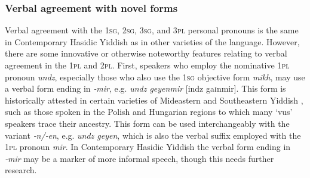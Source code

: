 \documentclass[output=paper, hidelinks]{langscibook}
\begin{document}

 


\subsubsection{Verbal agreement with novel forms}\label{sec:verbalfindings}

Verbal agreement with the 1\textsc{sg}, 2\textsc{sg}, 3\textsc{sg}, and 3\textsc{pl} personal pronouns is the same in Contemporary Hasidic Yiddish as in other varieties of the language. However, there are some innovative or otherwise noteworthy features relating to verbal agreement in the 1\textsc{pl} and 2\textsc{pl}. First, speakers who employ the nominative 1\textsc{pl} pronoun \textit{undz}, especially those who also use the 1\textsc{sg} objective form \textit{mikh}, may use a verbal form ending in \textit{‑mir}, e.g. \textit{undz geyenmir} [indz gaɪnmir]. This form is historically attested in certain varieties of Mideastern and Southeastern Yiddish \citep[70, 189]{Jacobs05}, such as those spoken in the Polish and Hungarian regions to which many ‘vus’ speakers trace their ancestry. This form can be used interchangeably with the variant \textit{‑n/‑en}, e.g. \textit{undz geyen}, which is also the verbal suffix employed with the 1\textsc{pl} pronoun \textit{mir}. In Contemporary Hasidic Yiddish the verbal form ending in \textit{‑mir} may be a marker of more informal speech, though this needs further research. 
\end{document}
